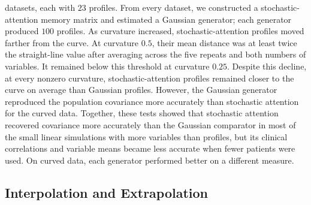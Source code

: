 datasets, each with $23$ profiles. From every dataset, we constructed a stochastic-attention
memory matrix and estimated a Gaussian generator; each generator produced $100$ profiles. As
curvature increased, stochastic-attention profiles moved farther from the curve. At curvature
$0.5$, their mean distance was at least twice the straight-line value after averaging across
the five repeats and both numbers of variables. It remained below this threshold at curvature
$0.25$. Despite this decline, at every nonzero curvature, stochastic-attention profiles
remained closer to the curve on average than Gaussian profiles. However, the Gaussian
generator reproduced the population covariance more accurately than stochastic attention for
the curved data. Together, these tests showed that stochastic attention recovered covariance more accurately than the Gaussian
comparator in most of the small linear simulations with more variables than profiles, but its
clinical correlations and variable means became less accurate when fewer patients were used.
On curved data, each generator performed better on a different measure.

\subsection{Interpolation and Extrapolation}

